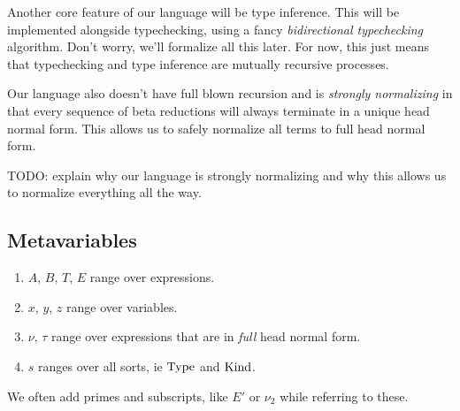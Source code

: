 \documentclass{article}
\begin{document}
Another core feature of our language will be type inference.
This will be implemented alongside typechecking, using a fancy
\textit{bidirectional typechecking} algorithm. Don't worry, we'll formalize all
this later. For now, this just means that typechecking and type inference are
mutually recursive processes.

Our language also doesn't have full blown recursion and is
\textit{strongly normalizing} in that every sequence of beta reductions will
always terminate in a unique head normal form. This allows us to safely
normalize all terms to full head normal form.

TODO: explain why our language is strongly normalizing and why this allows us to
normalize everything all the way.

\subsection{Metavariables}
\begin{enumerate}
\item $A$, $B$, $T$, $E$ range over expressions. 
\item $x$, $y$, $z$ range over variables. 
\item $\nu, \, \tau$ range over expressions that are in \textit{full} head normal
  form.
\item $s$ ranges over all sorts, ie $\operatorname{Type}$ and $\operatorname{Kind}$.
  \begin{comment}
    We define this set of expressions inductively via:
    \[ \begin{prooftree} \infer0{\Type} \end{prooftree} \]
    \[ \begin{prooftree} \infer0{x} \end{prooftree} \]
    \[ \begin{prooftree} \hypo{\nu} \infer1{x} \end{prooftree} \]
    \[ \begin{prooftree}
        \hypo{x}
        \hypo{\tau}
        \hypo{\tau'}
        \infer3{\Pi_{x : \tau} \tau'}
      \end{prooftree} \]
    \[ \begin{prooftree} \infer0{\Type} \end{prooftree} \]
  \end{comment}
\end{enumerate}

We often add primes and subscripts, like $E'$ or $\nu_2$ while referring to these.
\end{document}
